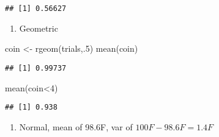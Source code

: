 \documentclass[
]{article}
\newenvironment{Shaded}{\begin{snugshade}}{\end{snugshade}}
\newcommand{\DecValTok}[1]{\textcolor[rgb]{0.00,0.00,0.81}{#1}}
\newcommand{\FunctionTok}[1]{\textcolor[rgb]{0.00,0.00,0.00}{#1}}
\newcommand{\NormalTok}[1]{#1}
\newcommand{\OtherTok}[1]{\textcolor[rgb]{0.56,0.35,0.01}{#1}}
\newcommand{\SpecialCharTok}[1]{\textcolor[rgb]{0.00,0.00,0.00}{#1}}
\providecommand{\tightlist}{%
  \setlength{\itemsep}{0pt}\setlength{\parskip}{0pt}}
\begin{document}
\begin{verbatim}
## [1] 0.56627
\end{verbatim}

\begin{enumerate}
\def\labelenumi{\alph{enumi}.}
\setcounter{enumi}{4}
\tightlist
\item
  Geometric
\end{enumerate}

\begin{Shaded}
\begin{Highlighting}[]
\NormalTok{coin }\OtherTok{\textless{}{-}} \FunctionTok{rgeom}\NormalTok{(trials,.}\DecValTok{5}\NormalTok{)}
\FunctionTok{mean}\NormalTok{(coin)}
\end{Highlighting}
\end{Shaded}

\begin{verbatim}
## [1] 0.99737
\end{verbatim}

\begin{Shaded}
\begin{Highlighting}[]
\FunctionTok{mean}\NormalTok{(coin}\SpecialCharTok{\textless{}}\DecValTok{4}\NormalTok{)}
\end{Highlighting}
\end{Shaded}

\begin{verbatim}
## [1] 0.938
\end{verbatim}

\begin{enumerate}
\def\labelenumi{\alph{enumi}.}
\setcounter{enumi}{5}
\tightlist
\item
  Normal, mean of 98.6F, var of \(100F - 98.6F = 1.4F\)
\end{enumerate}
\end{document}
